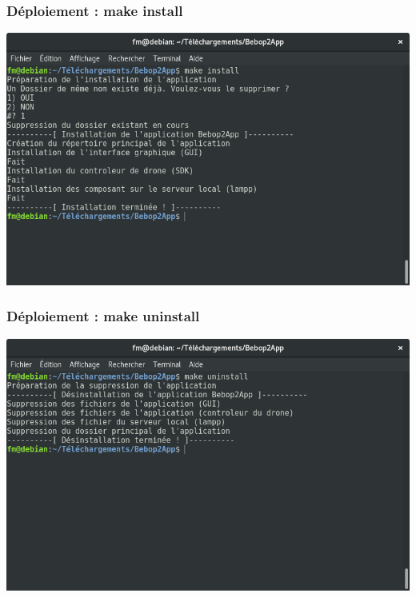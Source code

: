 \documentclass{beamer}
\begin{document}
	
	\begin{frame}
		\begin{center}
		\frametitle{Déploiement : make install}
        \includegraphics[scale=0.4]{make_install.png}
		\end{center}
	\end{frame}


    \begin{frame}
		\begin{center}
		\frametitle{Déploiement : make uninstall}
        \includegraphics[scale=0.4]{make_uninstall.png}
		\end{center}
	\end{frame}
\end{document}
